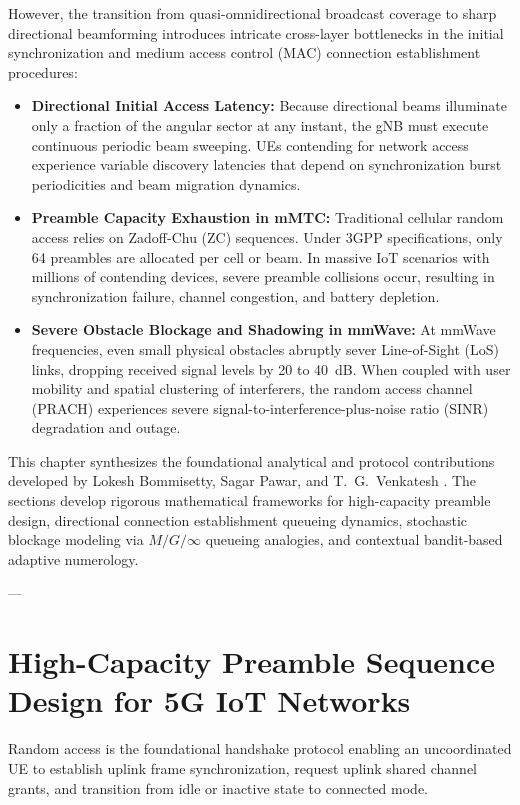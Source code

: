 However, the transition from quasi-omnidirectional broadcast coverage to sharp directional beamforming introduces intricate cross-layer bottlenecks in the initial synchronization and medium access control (MAC) connection establishment procedures:
\begin{itemize}
    \item \textbf{Directional Initial Access Latency:} Because directional beams illuminate only a fraction of the angular sector at any instant, the gNB must execute continuous periodic beam sweeping. UEs contending for network access experience variable discovery latencies that depend on synchronization burst periodicities and beam migration dynamics.
    \item \textbf{Preamble Capacity Exhaustion in mMTC:} Traditional cellular random access relies on Zadoff-Chu (ZC) sequences. Under 3GPP specifications, only 64 preambles are allocated per cell or beam. In massive IoT scenarios with millions of contending devices, severe preamble collisions occur, resulting in synchronization failure, channel congestion, and battery depletion.
    \item \textbf{Severe Obstacle Blockage and Shadowing in mmWave:} At mmWave frequencies, even small physical obstacles abruptly sever Line-of-Sight (LoS) links, dropping received signal levels by 20 to 40~dB. When coupled with user mobility and spatial clustering of interferers, the random access channel (PRACH) experiences severe signal-to-interference-plus-noise ratio (SINR) degradation and outage.
\end{itemize}

This chapter synthesizes the foundational analytical and protocol contributions developed by Lokesh Bommisetty, Sagar Pawar, and T.~G.~Venkatesh \cite{pawar2023high, bommisetty2023connection, bommisetty2022mmwave, bommisetty2024contextual}. The sections develop rigorous mathematical frameworks for high-capacity preamble design, directional connection establishment queueing dynamics, stochastic blockage modeling via $M/G/\infty$ queueing analogies, and contextual bandit-based adaptive numerology.

---

\section{High-Capacity Preamble Sequence Design for 5G IoT Networks}
\label{sec:5g_preamble_design}

Random access is the foundational handshake protocol enabling an uncoordinated UE to establish uplink frame synchronization, request uplink shared channel grants, and transition from idle or inactive state to connected mode.


